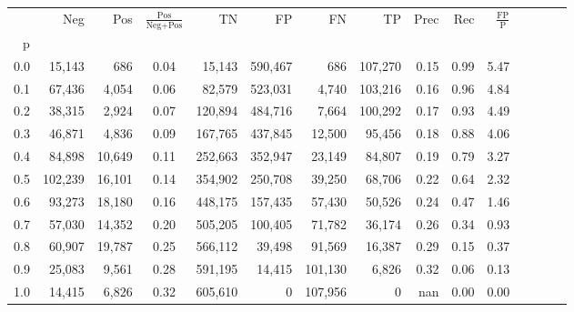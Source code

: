 \begin{tabular}{rrrcrrrrrrrrrrr}
\toprule
{} &      Neg &     Pos & $\frac{\text{Pos}}{\text{Neg}+\text{Pos}}$ &       TN &       FP &       FN &       TP &  Prec &   Rec & $\frac{\text{FP}}{\text{P}}$ \\
p   &          &         &                                            &          &          &          &          &       &       &                              \\
\midrule
0.0 &   15,143 &     686 &                                       0.04 &   15,143 &  590,467 &      686 &  107,270 &  0.15 &  0.99 &                         5.47 \\
0.1 &   67,436 &   4,054 &                                       0.06 &   82,579 &  523,031 &    4,740 &  103,216 &  0.16 &  0.96 &                         4.84 \\
0.2 &   38,315 &   2,924 &                                       0.07 &  120,894 &  484,716 &    7,664 &  100,292 &  0.17 &  0.93 &                         4.49 \\
0.3 &   46,871 &   4,836 &                                       0.09 &  167,765 &  437,845 &   12,500 &   95,456 &  0.18 &  0.88 &                         4.06 \\
0.4 &   84,898 &  10,649 &                                       0.11 &  252,663 &  352,947 &   23,149 &   84,807 &  0.19 &  0.79 &                         3.27 \\
0.5 &  102,239 &  16,101 &                                       0.14 &  354,902 &  250,708 &   39,250 &   68,706 &  0.22 &  0.64 &                         2.32 \\
0.6 &   93,273 &  18,180 &                                       0.16 &  448,175 &  157,435 &   57,430 &   50,526 &  0.24 &  0.47 &                         1.46 \\
0.7 &   57,030 &  14,352 &                                       0.20 &  505,205 &  100,405 &   71,782 &   36,174 &  0.26 &  0.34 &                         0.93 \\
0.8 &   60,907 &  19,787 &                                       0.25 &  566,112 &   39,498 &   91,569 &   16,387 &  0.29 &  0.15 &                         0.37 \\
0.9 &   25,083 &   9,561 &                                       0.28 &  591,195 &   14,415 &  101,130 &    6,826 &  0.32 &  0.06 &                         0.13 \\
1.0 &   14,415 &   6,826 &                                       0.32 &  605,610 &        0 &  107,956 &        0 &   nan &  0.00 &                         0.00 \\
\bottomrule
\end{tabular}
